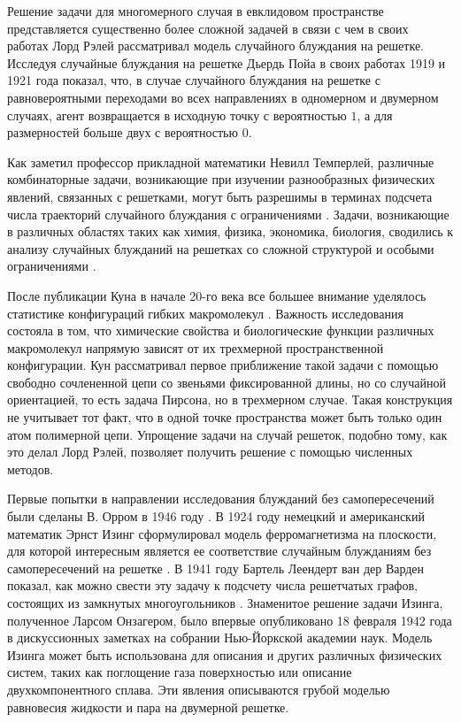 Решение задачи для многомерного случая в евклидовом пространстве представляется существенно более сложной задачей в связи с чем в своих работах Лорд Рэлей рассматривал модель случайного блуждания на решетке. Исследуя случайные блуждания на решетке Дьердь Пойа в своих работах 1919 и 1921 года \cite{polya_uber_1921} показал, что, в случае случайного блуждания на решетке с равновероятными переходами во всех направлениях в одномерном и двумерном случаях, агент возвращается в исходную точку с вероятностью $1$, а для размерностей больше двух с вероятностью $0$.

Как заметил профессор прикладной математики Невилл Темперлей, различные комбинаторные задачи, возникающие при изучении разнообразных физических явлений, связанных с решетками, могут быть разрешимы в терминах подсчета числа траекторий случайного блуждания с ограничениями \cite{temperley_combinatorial_1956}. Задачи, возникающие в различных областях таких как химия, физика, экономика, биология, сводились к анализу случайных блужданий на решетках со сложной структурой и особыми ограничениями \cite{kuhn_uber_1930, flory_principles_1953, gee_interaction_1946, ising_beitrag_1925, tricomi_funzioni_1954}. 

После публикации Куна в начале 20-го века все большее внимание уделялось статистике конфигураций гибких макромолекул \cite{kuhn_uber_1930}. Важность исследования состояла в том, что химические свойства и биологические функции различных макромолекул напрямую зависят от их трехмерной пространственной конфигурации. Кун рассматривал первое приближение такой задачи с помощью свободно сочлененной цепи со звеньями фиксированной длины, но со случайной ориентацией, то есть задача Пирсона, но в трехмерном случае. Такая конструкция не учитывает тот факт, что в одной точке пространства может быть только один атом полимерной цепи. Упрощение задачи на случай решеток, подобно тому, как это делал Лорд Рэлей, позволяет получить решение с помощью численных методов.

Первые попытки в направлении исследования блужданий без самопересечений были сделаны В. Орром в 1946 году \cite{gee_interaction_1946}. В 1924 году немецкий и американский математик Эрнст Изинг сформулировал модель ферромагнетизма на плоскости, для которой интересным является ее соответствие случайным блужданиям без самопересечений на решетке \cite{ising_beitrag_1925}. В 1941 году Бартель Леендерт ван дер Варден показал, как можно свести эту задачу к подсчету числа решетчатых графов, состоящих из замкнутых многоугольников \cite{van_der_waerden_lange_1941}. Знаменитое решение задачи Изинга, полученное Ларсом Онзагером, было впервые опубликовано 18 февраля 1942 года в дискуссионных заметках на собрании Нью-Йоркской академии наук. Модель Изинга может быть использована для описания и других различных физических систем, таких как поглощение газа поверхностью или описание двухкомпонентного сплава. Эти явления описываются грубой моделью равновесия жидкости и пара на двумерной решетке.

